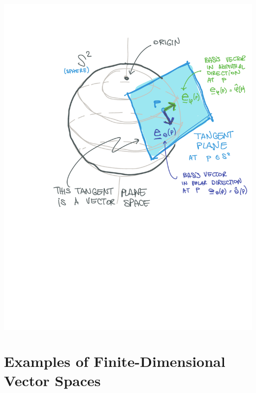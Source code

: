 \documentclass[
  11pt,
	colorful,
	raggedright,
]{tufte-style-thesis-flip}
\begin{document}
\begin{center}
\includegraphics[width=.7\textwidth]{figures/Lec_2021_tangentS2.pdf}
\end{center}




\section{Examples of Finite-Dimensional Vector Spaces}
\end{document}

